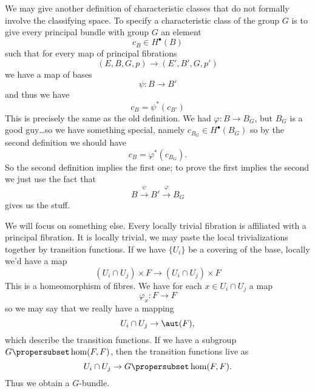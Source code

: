 \begin{rmk}
We may give another definition of characteristic classes that do
not formally involve the classifying space. To specify a
characteristic class of the group $G$ is to give every principal
bundle with group $G$ an element 
\begin{equation}
c_{B}\in H^{\bullet}(B)
\end{equation}
such that for every map of principal fibrations
\begin{equation}
(E,B,G,p)\to(E',B',G,p')
\end{equation}
we have a map of bases
\begin{equation}
\psi\colon B\to B'
\end{equation}
and thus we have
\begin{equation}
c_{B}=\psi^{*}(c_{B'})
\end{equation}
This is precisely the same as the old definition. We had
$\varphi\colon B\to B_{G}$, but $B_{G}$ is a good guy\dots so we
have something special, namely $c_{B_{G}}\in H^{\bullet}(B_{G})$
so by the second definition we should have
\begin{equation}
c_{B}=\varphi^{*}(c_{B_{G}}). 
\end{equation}
So the second definition implies the first one; to prove the
first implies the second we just use the fact that 
\begin{equation}
B\xrightarrow{\;\psi\;}B'\xrightarrow{\;\varphi\;}B_{G}
\end{equation}
gives us the stuff.
\end{rmk}

We will focus on something else. Every locally trivial
fibration
is affiliated with a principal fibration. It is locally trivial,
we may paste the local trivializations together by transition
functions. If we have $\{U_{i}\}$ be a covering of the base,
locally we'd have a map
\begin{equation}
(U_{i}\cap U_{j})\times F\to (U_{i}\cap U_{j})\times F
\end{equation}
This is a homeomorphism of fibres. We have for each $x\in
U_{i}\cap U_{j}$ a map 
\begin{equation}
\varphi_{x}\colon F\to F
\end{equation}
so we may say that we really have a mapping
\begin{equation}
U_{i}\cap U_{j}\to\aut(F),
\end{equation}
which describe the transition functions.
If we have a subgroup $G\propersubset\hom(F,F)$, then the
transition functions live as
\begin{equation}
U_{i}\cap U_{j}\to G\propersubset\hom(F,F).
\end{equation}
Thus we obtain a $G$-bundle.

